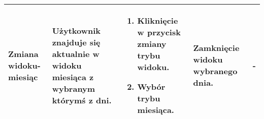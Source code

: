 \documentclass{article}
\begin{document}
\begin{flushleft}
\begin{longtable}[H]{| m{3.5cm} | m{3.5cm} | m{3.5cm} | m{3.5cm} | m{3.5cm} |}
	Zmiana widoku- miesiąc & Użytkownik znajduje się aktualnie w widoku miesiąca z wybranym którymś z dni. & \begin{enumerate}[leftmargin =*, topsep=0pt] \item Kliknięcie w przycisk zmiany trybu 
	widoku. \item Wybór trybu miesiąca. \end{enumerate} & Zamknięcie widoku wybranego dnia. & - \\ \hline
	\end{longtable}

\end{flushleft}
\end{document}
